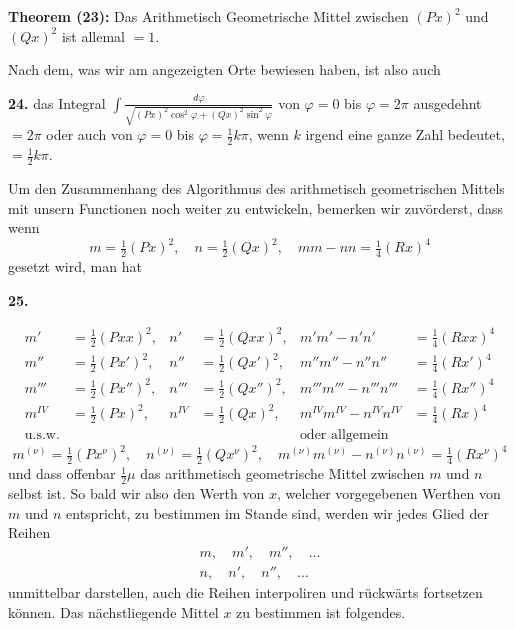 \documentclass[10pt,a4paper]{article}
\begin{document}
\textbf{Theorem (23):} Das Arithmetisch Geometrische Mittel zwischen $(Px)^2$ und $(Qx)^2$ ist allemal $= 1$.

Nach dem, was wir am angezeigten Orte bewiesen haben, ist also auch

\textbf{24.} das Integral $\displaystyle\int \frac{d\varphi}{\sqrt{(Px)^2 \cos^2\varphi + (Qx)^2 \sin^2\varphi}}$ von $\varphi = 0$ bis $\varphi = 2\pi$ ausgedehnt $= 2\pi$ oder auch von $\varphi = 0$ bis $\varphi = \frac{1}{2}k\pi$, wenn $k$ irgend eine ganze Zahl bedeutet, $= \frac{1}{2}k\pi$.

Um den Zusammenhang des Algorithmus des arithmetisch geometrischen Mittels mit unsern Functionen noch weiter zu entwickeln, bemerken wir zuv\"orderst, dass wenn
%
\begin{equation*}
m = \tfrac{1}{2}(Px)^2, \quad n = \tfrac{1}{2}(Qx)^2, \quad mm - nn = \tfrac{1}{4}(Rx)^4
\end{equation*}
%
gesetzt wird, man hat

\newpage
\textbf{25.}

\begin{align*}
m' &= \tfrac{1}{2}(Pxx)^2, & n' &= \tfrac{1}{2}(Qxx)^2, & m'm' - n'n' &= \tfrac{1}{4}(Rxx)^4 \\
m'' &= \tfrac{1}{2}(Px')^2, & n'' &= \tfrac{1}{2}(Qx')^2, & m''m'' - n''n'' &= \tfrac{1}{4}(Rx')^4 \\
m''' &= \tfrac{1}{2}(Px'')^2, & n''' &= \tfrac{1}{2}(Qx'')^2, & m'''m''' - n'''n''' &= \tfrac{1}{4}(Rx'')^4 \\
m^{IV} &= \tfrac{1}{2}(Px)^2, & n^{IV} &= \tfrac{1}{2}(Qx)^2, & m^{IV}m^{IV} - n^{IV}n^{IV} &= \tfrac{1}{4}(Rx)^4 \\
\text{u.s.w.} &&&& \text{oder allgemein}
\end{align*}
%
\begin{equation*}
m^{(\nu)} = \tfrac{1}{2}(Px^{\nu})^2, \quad n^{(\nu)} = \tfrac{1}{2}(Qx^{\nu})^2, \quad m^{(\nu)}m^{(\nu)} - n^{(\nu)}n^{(\nu)} = \tfrac{1}{4}(Rx^{\nu})^4
\end{equation*}
%
und dass offenbar $\frac{1}{2}\mu$ das arithmetisch geometrische Mittel zwischen $m$ und $n$ selbst ist. So bald wir also den Werth von $x$, welcher vorgegebenen Werthen von $m$ und $n$ entspricht, zu bestimmen im Stande sind, werden wir jedes Glied der Reihen
%
\begin{align*}
m, \quad m', \quad m'', \quad \ldots \\
n, \quad n', \quad n'', \quad \ldots
\end{align*}
%
unmittelbar darstellen, auch die Reihen interpoliren und r\"uckw\"arts fortsetzen k\"onnen. Das n\"achstliegende Mittel $x$ zu bestimmen ist folgendes.
\end{document}
